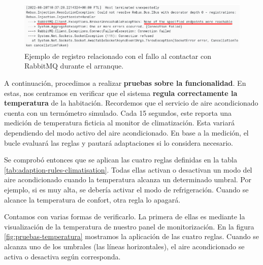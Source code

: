 \begin{figure}[htb]
  \centering
  \includegraphics[scale=0.45]{cap_despliegue/images/Logs-fallo-RabbitMQ}
  \caption{Ejemplo de registro relacionado con el fallo al contactar con RabbitMQ durante el arranque.}
  \label{fig:prueba-logs-error-rabbitmq}
\end{figure}

A continuación, procedimos a realizar \textbf{pruebas sobre la funcionalidad}. En estas, nos centramos en verificar que el sistema \textbf{regula correctamente la temperatura} de la habitación. Recordemos que el servicio de aire acondicionado cuenta con un termómetro simulado. Cada 15 segundos, este reporta una medición de temperatura ficticia al monitor de climatización. Esta variará dependiendo del modo activo del aire acondicionado. En base a la medición, el bucle evaluará las reglas y pautará adaptaciones si lo considera necesario.

Se comprobó entonces que se aplican las cuatro reglas definidas en la tabla \ref{tab:adaption-rules-climatisation}. Todas ellas activan o desactivan un modo del aire acondicionado cuando la temperatura alcanza un determinado umbral. Por ejemplo, si es muy alta, se debería activar el modo de refrigeración. Cuando se alcance la temperatura de confort, otra regla lo apagará.

Contamos con varias formas de verificarlo. La primera de ellas es mediante la visualización de la temperatura de nuestro panel de monitorización. En la figura \ref{fig:pruebas-temperatura} mostramos la aplicación de las cuatro reglas. Cuando se alcanza uno de los umbrales (las líneas horizontales), el aire acondicionado se activa o desactiva según corresponda.

